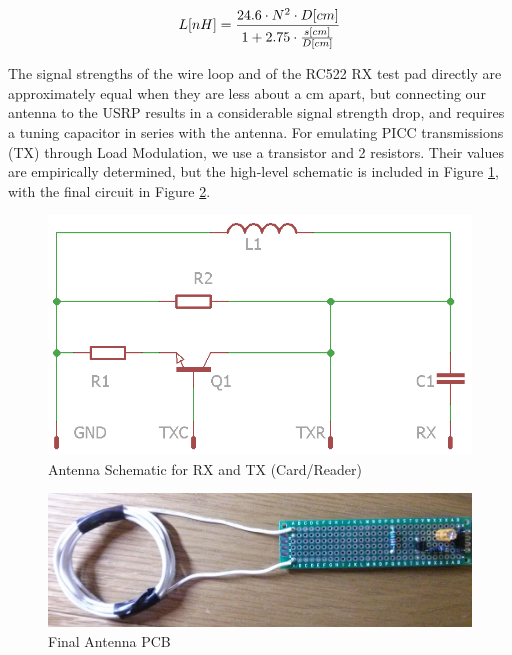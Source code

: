 \documentclass[fleqn,10pt]{SelfArx} %
\begin{document}
\begin{equation}
\label{eq:inductance}
\hfill L [nH] = \frac{24.6 \cdot N^2\cdot D[cm]}{1+2.75\cdot\frac{s[cm]}{D[cm]}}\hspace*{\fill}
\end{equation}

The signal strengths of the wire loop and of the RC522 RX test pad directly are approximately equal when they are less about a cm apart, but connecting our antenna to the USRP results in a considerable signal strength drop, and requires a tuning capacitor in series with the antenna. For emulating PICC transmissions (TX) through Load Modulation, we use a transistor and 2 resistors. Their values are empirically determined, but the high-level schematic is included in Figure \ref{fig:antennaschematic}, with the final circuit in Figure \ref{fig:antennapic}.

\begin{figure}[tp]
  \includegraphics[width=\linewidth]{img/antennaschematic}
  \caption{Antenna Schematic for RX and TX (Card/Reader)}
  \label{fig:antennaschematic}
\end{figure}

\begin{figure}[tp]
  \includegraphics[width=\linewidth]{img/antennapic}
  \caption{Final Antenna PCB}
  \label{fig:antennapic}
\end{figure}
\end{document}
